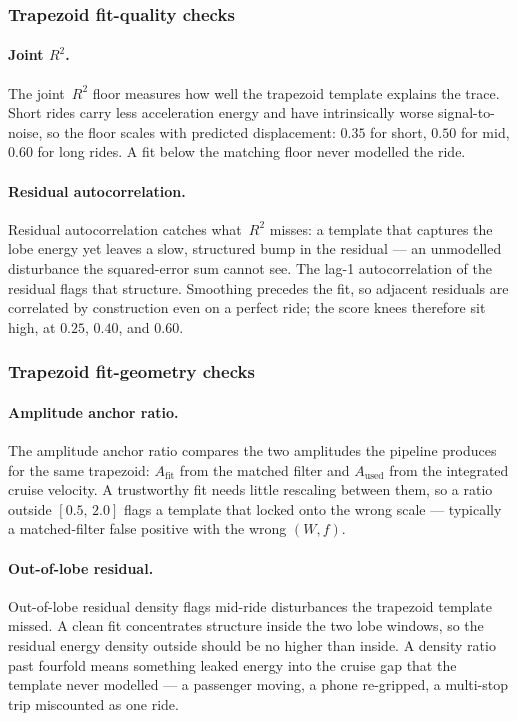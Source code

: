 \documentclass[manuscript,review,screen]{acmart}
\begin{document}
\subsubsection*{Trapezoid fit-quality checks}

\paragraph{Joint $R^{2}$.}
The joint~$R^{2}$ floor measures how well the trapezoid template
explains the trace.  Short rides carry less acceleration energy and
have intrinsically worse signal-to-noise, so the floor scales with
predicted displacement: $0.35$ for short, $0.50$ for mid, $0.60$ for
long rides.  A fit below the matching floor never modelled the ride.

\paragraph{Residual autocorrelation.}
Residual autocorrelation catches what~$R^{2}$ misses: a template that
captures the lobe energy yet leaves a slow, structured bump in the
residual --- an unmodelled disturbance the squared-error sum cannot
see.  The lag-1 autocorrelation of the residual flags that structure.
Smoothing precedes the fit, so adjacent residuals are correlated by
construction even on a perfect ride; the score knees therefore sit
high, at $0.25$, $0.40$, and $0.60$.

\subsubsection*{Trapezoid fit-geometry checks}

\paragraph{Amplitude anchor ratio.}
The amplitude anchor ratio compares the two amplitudes the pipeline
produces for the same trapezoid: $A_{\mathrm{fit}}$ from the matched
filter and $A_{\mathrm{used}}$ from the integrated cruise velocity.
A trustworthy fit needs little rescaling between them, so a ratio
outside $[0.5,\,2.0]$ flags a template that locked onto the wrong
scale --- typically a matched-filter false positive with the wrong
$(W,f)$.

\paragraph{Out-of-lobe residual.}
Out-of-lobe residual density flags mid-ride disturbances the
trapezoid template missed.  A clean fit concentrates structure inside
the two lobe windows, so the residual energy density outside should
be no higher than inside.  A density ratio past fourfold means
something leaked energy into the cruise gap that the template never
modelled --- a passenger moving, a phone re-gripped, a multi-stop
trip miscounted as one ride.
\end{document}
